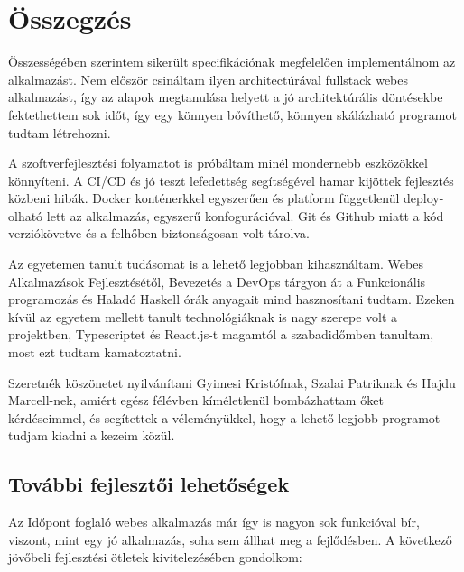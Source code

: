 \chapter{Összegzés} %
\label{ch:sum}

Összességében szerintem sikerült specifikációnak megfelelően implementálnom az alkalmazást. Nem először csináltam ilyen architectúrával fullstack webes alkalmazást, így az alapok megtanulása helyett a jó architektúrális döntésekbe fektethettem sok időt, így egy könnyen bővíthető, könnyen skálázható programot tudtam létrehozni.

A szoftverfejlesztési folyamatot is próbáltam minél mondernebb eszközökkel könnyíteni. A CI/CD és jó teszt lefedettség segítségével hamar kijöttek fejlesztés közbeni hibák. Docker konténerkkel egyszerűen és platform függetlenül deploy-olható lett az alkalmazás, egyszerű konfogurációval. Git és Github miatt a kód verziókövetve és a felhőben biztonságosan volt tárolva.

Az egyetemen tanult tudásomat is a lehető legjobban kihasználtam. Webes Alkalmazások Fejlesztésétől, Bevezetés a DevOps tárgyon át a Funkcionális programozás és Haladó Haskell órák anyagait mind hasznosítani tudtam. Ezeken kívül az egyetem mellett tanult technológiáknak is nagy szerepe volt a projektben, Typescriptet és React.js-t magamtól a szabadidőmben tanultam, most ezt tudtam kamatoztatni.

Szeretnék köszönetet nyilvánítani Gyimesi Kristófnak, Szalai Patriknak és Hajdu Marcell-nek, amiért egész félévben kíméletlenül bombázhattam őket kérdéseimmel, és segítettek a véleményükkel, hogy a lehető legjobb programot tudjam kiadni a kezeim közül.

\clearpage

\section{További fejlesztői lehetőségek}
Az Időpont foglaló webes alkalmazás már így is nagyon sok funkcióval bír, viszont, mint egy jó alkalmazás, soha sem állhat meg a fejlődésben. A következő jövőbeli fejlesztési ötletek kivitelezésében gondolkom:

